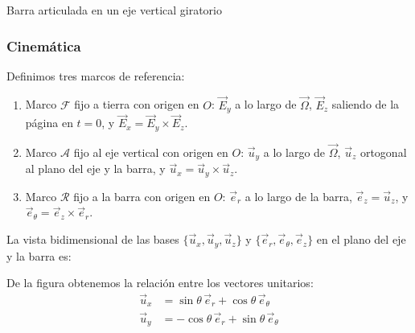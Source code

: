 \begin{solucion}{Barra articulada en un eje vertical giratorio}
\subsubsection*{Cinemática}

Definimos tres marcos de referencia:
\begin{enumerate}
    \item Marco $\mathcal{F}$ fijo a tierra con origen en $O$: $\vec{E}_y$ a lo largo de $\vec{\Omega}$, $\vec{E}_z$ saliendo de la página en $t=0$, y $\vec{E}_x = \vec{E}_y \times \vec{E}_z$.
    \item Marco $\mathcal{A}$ fijo al eje vertical con origen en $O$: $\vec{u}_y$ a lo largo de $\vec{\Omega}$, $\vec{u}_z$ ortogonal al plano del eje y la barra, y $\vec{u}_x = \vec{u}_y \times \vec{u}_z$.
    \item Marco $\mathcal{R}$ fijo a la barra con origen en $O$: $\vec{e}_r$ a lo largo de la barra, $\vec{e}_z = \vec{u}_z$, y $\vec{e}_\theta = \vec{e}_z \times \vec{e}_r$.
\end{enumerate}

La vista bidimensional de las bases $\{\vec{u}_x, \vec{u}_y, \vec{u}_z\}$ y $\{\vec{e}_r, \vec{e}_\theta, \vec{e}_z\}$ en el plano del eje y la barra es:

\begin{center}
\end{center}

De la figura obtenemos la relación entre los vectores unitarios:
\begin{align}
    \vec{u}_x &= \sin\theta\,\vec{e}_r + \cos\theta\,\vec{e}_\theta \\
    \vec{u}_y &= -\cos\theta\,\vec{e}_r + \sin\theta\,\vec{e}_\theta
\end{align}


\end{solucion}
